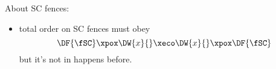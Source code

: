 About SC fences:
\begin{itemize}
\item total order on SC fences must obey
  \begin{displaymath}
    \DF{\fSC}\xpox\DW{x}{}\xeco\DW{x}{}\xpox\DF{\fSC}
  \end{displaymath}
  but it's not in happens before.
\end{itemize}


\endinput

\section{Address Calculation and If-Closure}
\label{sec:addr-if}
\subsection{Address Calculation}
\label{sec:semaddr}
